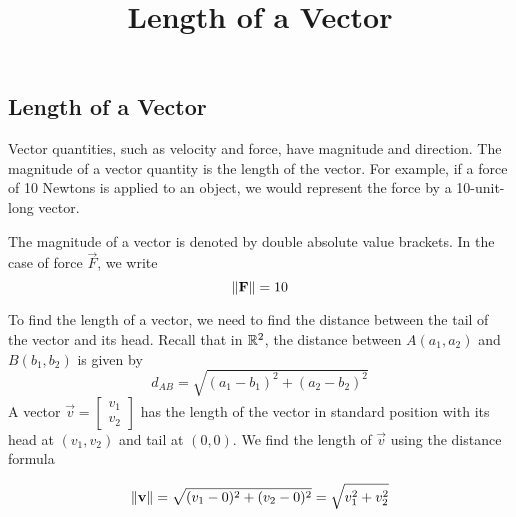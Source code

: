 \documentclass{ximera}
\title{Length of a Vector} \license{CC BY-NC-SA 4.0}
\begin{document}
\begin{abstract}

\end{abstract}
\maketitle

\begin{onlineOnly}
\section*{Length of a Vector}
\end{onlineOnly}

Vector quantities, such as velocity and force, have magnitude and direction.  The magnitude of a vector quantity is the length of the vector.  For example, if a force of 10 Newtons is applied to an object, we would represent the force by a 10-unit-long vector.

 \begin{center}
\end{center}

The magnitude of a vector is denoted by double absolute value brackets.  In the case of force $\vec{F}$, we write $$\left\lVert\mathbf{F}\right\rVert=10$$

To find the length of a vector, we need to find the distance between the tail of the vector and its head.  Recall that in $\mathbb{R}^2$, the distance between $A(a_1, a_2)$ and $B(b_1, b_2)$ is given by 
\begin{equation*}
d_{AB}=\sqrt{(a_1-b_1)^2+(a_2-b_2)^2}
\end{equation*}
A vector $\vec{v}=\begin{bmatrix}v_1\\ v_2\end{bmatrix}$ has the length of  the vector in standard position with its head at $(v_1, v_2)$ and tail at $(0, 0)$. We find the length of $\vec{v}$ using the distance formula

\begin{equation}\label{eq:normr2}
\left\lVert\mathbf{v}\right\rVert=\sqrt{(v_1-0)^2+(v_2-0)^2}=\sqrt{v_1^2+v_2^2}
\end{equation}
\end{document}

